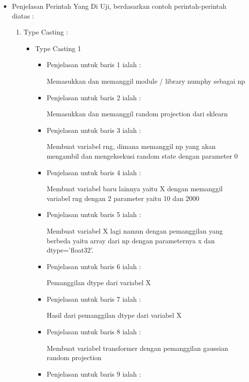 \begin{enumerate}
\begin{itemize}
\par
\item Penjelasan Perintah Yang Di Uji, berdasarkan contoh perintah-perintah diatas :
\begin{enumerate}
\item Type Casting :
\begin{itemize}
\item Type Casting 1
\par
\begin{itemize}
\item Penjelasan untuk baris 1 ialah : 
\par Memasukkan dan memanggil module / library numphy sebagai np
\par
\par
\item Penjelasan untuk baris 2 ialah :
\par Memasukkan dan memanggil random projection dari sklearn
\par
\item Penjelasan untuk baris 3  ialah :
\par Membuat variabel rng, dimana memanggil np yang akan mengambil dan mengeksekusi random state dengan parameter 0
\par
\item Penjelasan untuk baris 4  ialah :
\par Membuat variabel baru lainnya yaitu X dengan memanggil variabel rng dengan 2 parameter yaitu 10 dan 2000
\par
\item Penjelasan untuk baris 5  ialah :
\par Membuat variabel X lagi namun dengan pemanggilan yang berbeda yaitu array dari np dengan parameternya x dan dtype='float32'.
\par
\item Penjelasan untuk baris 6 ialah :
\par Pemanggilan dtype dari variabel X
\par
\item Penjelasan untuk baris 7 ialah : 
\par Hasil dari pemanggilan dtype dari variabel X
\par
\par
\item Penjelasan untuk baris 8 ialah :
\par Membuat variabel transformer dengan pemanggilan gaussian random projection
\par
\item Penjelasan untuk baris 9 ialah :

\end{itemize}
\end{itemize}
\end{enumerate}
\end{itemize}
\end{enumerate}
